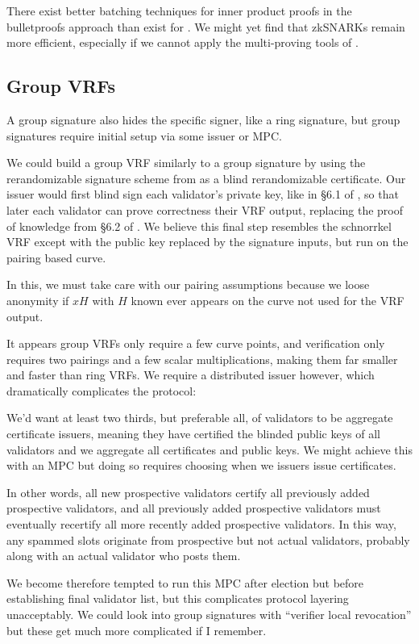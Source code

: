 There exist better batching techniques for inner product proofs \cite{bccgp2016} in the bulletproofs approach \cite{bulletproofs} than exist for \cite{Groth16}.  We might yet find that zkSNARKs remain more efficient, especially if we cannot apply the multi-proving tools of \cite{bulletproofs}.

\subsection{Group VRFs}

A group signature also hides the specific signer, like a ring signature, but group signatures require initial setup via some issuer or MPC. 

We could build a group VRF similarly to a group signature by using the rerandomizable signature scheme from \cite{PS16} as a blind rerandomizable certificate.  Our issuer would first blind sign each validator's private key, like in \S6.1 of \cite{PS16}, so that later each validator can prove correctness their VRF output, replacing the proof of knowledge from \S6.2 of \cite{PS16}.  We believe this final step resembles the schnorrkel VRF except with the public key replaced by the signature inputs, but run on the pairing based curve.

In this, we must take care with our pairing assumptions because we loose anonymity if $x H$ with $H$ known ever appears on the curve not used for the VRF output.  

It appears group VRFs only require a few curve points, and verification only requires two pairings and a few scalar multiplications, making them far smaller and faster than ring VRFs.  We require a distributed issuer however, which dramatically complicates the protocol:

We'd want at least two thirds, but preferable all, of validators to be aggregate certificate issuers, meaning they have certified the blinded public keys of all validators and we aggregate all certificates and public keys.  We might achieve this with an MPC but doing so requires choosing when we issuers issue certificates.  

In other words, all new prospective validators certify all previously added prospective validators, and all previously added prospective validators must eventually recertify all more recently added prospective validators.  In this way, any spammed slots originate from prospective but not actual validators, probably along with an actual validator who posts them.  

We become therefore tempted to run this MPC after election but before establishing final validator list, but this complicates protocol layering unacceptably.  We could look into group signatures with ``verifier local revocation'' but these get much more complicated if I remember.




